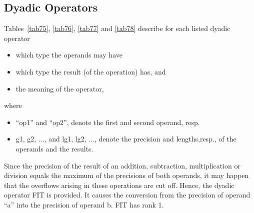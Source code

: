 \subsection{Dyadic Operators}   %

Tables~\ref{tab75}, \ref{tab76}, \ref{tab77} and \ref{tab78} describe for each listed dyadic operator
\begin{itemize}
\item which type the operands may have
\item which type the result (of the operation) has, and
\item the meaning of the operator,
\end{itemize}
where
\begin{itemize}
\item ``op1'' and ``op2'', denote the first and second operand, resp.
\item g1, g2, ..., and lg1, lg2, ..., denote the precision and
lengths,resp., of the operands and the results.
\end{itemize}
Since the precision of the result of an addition, subtraction,
multiplication or division equals the maximum of the precisions of both
operands, it may happen that the overflows arising in these operations
are cut off. Hence, the dyadic operator FIT is provided.
It causes the conversion from the precision of operand ``a'' into the
precision of operand b. FIT has rank 1.


